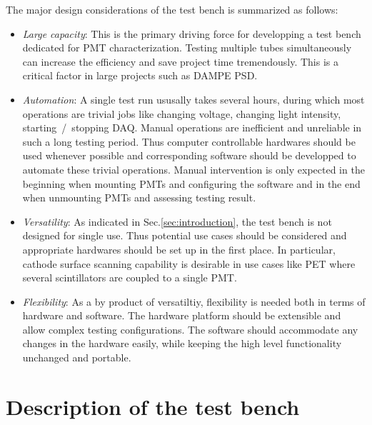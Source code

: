 \documentclass[5p, times]{elsarticle}
\begin{document}
The major design considerations of the test bench is summarized as follows:
\begin{itemize}
 \item \textit{Large capacity}: This is the primary driving force for developping a test bench dedicated for PMT characterization.
 Testing multiple tubes simultaneously can increase the efficiency and save project time tremendously.
 This is a critical factor in large projects such as DAMPE PSD.
 \item \textit{Automation}: A single test run ususally takes several hours, during which most operations are trivial jobs like changing voltage, changing light intensity, starting~/~stopping DAQ.
 Manual operations are inefficient and unreliable in such a long testing period.
 Thus computer controllable hardwares should be used whenever possible and corresponding software should be developped to automate these trivial operations.
 Manual intervention is only expected in the beginning when mounting PMTs and configuring the software and in the end when unmounting PMTs and assessing testing result. 
 \item \textit{Versatility}: As indicated in Sec.\ref{sec:introduction}, the test bench is not designed for single use.
 T\-h\-u\-s potential use cases should be considered and appropriate hardwares should be set up in the first place.
 In particular, cathode surface scanning capability is desirable in use cases like PET where several scintillators are coupled to a single PMT. 
 \item \textit{Flexibility}: As a by product of versatiltiy, flexibility is needed both in terms of hardware and software.
 The hardware platform should be extensible and allow complex testing configurations.
 The software should accommodate any changes in the hardware easily, while keeping the high level functionality unchanged and portable. 
\end{itemize}

\section{Description of the test bench}
\label{sec:description}
\end{document}
